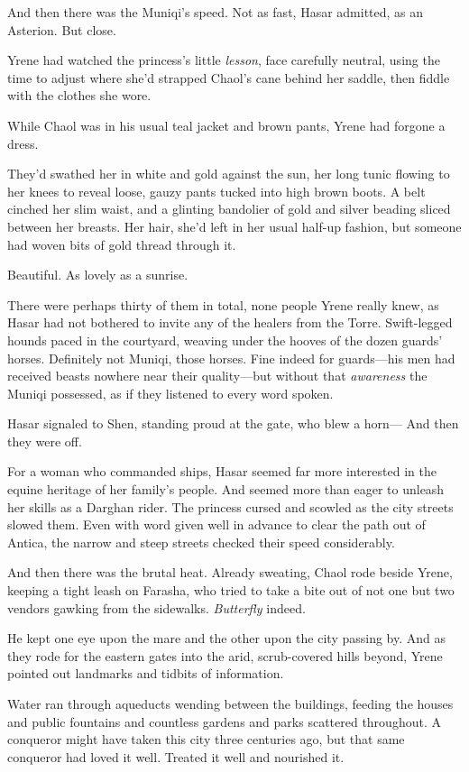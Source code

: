 And then there was the Muniqi's speed.
Not as fast, Hasar admitted, as an Asterion.
But close.

Yrene had watched the princess's little \emph{lesson}, face carefully neutral, using the time to adjust where she'd strapped Chaol's cane behind her saddle, then fiddle with the clothes she wore.

While Chaol was in his usual teal jacket and brown pants, Yrene had forgone a dress.

They'd swathed her in white and gold against the sun, her long tunic flowing to her knees to reveal loose, gauzy pants tucked into high brown boots.
A belt cinched her slim waist, and a glinting bandolier of gold and silver beading sliced between her breasts.
Her hair, she'd left in her usual half-up fashion, but someone had woven bits of gold thread through it.

Beautiful.
As lovely as a sunrise.

There were perhaps thirty of them in total, none people Yrene really knew, as Hasar had not bothered to invite any of the healers from the Torre.
Swift-legged hounds paced in the courtyard, weaving under the hooves of the dozen guards' horses.
Definitely not Muniqi, those horses.
Fine indeed for guards---his men had received beasts nowhere near their quality---but without that \emph{awareness} the Muniqi possessed, as if they listened to every word spoken.

Hasar signaled to Shen, standing proud at the gate, who blew a horn--- And then they were off.

For a woman who commanded ships, Hasar seemed far more interested in the equine heritage of her family's people.
And seemed more than eager to unleash her skills as a Darghan rider.
The princess cursed and scowled as the city streets slowed them.
Even with word given well in advance to clear the path out of Antica, the narrow and steep streets checked their speed considerably.

And then there was the brutal heat.
Already sweating, Chaol rode beside Yrene, keeping a tight leash on Farasha, who tried to take a bite out of not one but two vendors gawking from the sidewalks.
\emph{Butterfly}
indeed.

He kept one eye upon the mare and the other upon the city passing by.
And as they rode for the eastern gates into the arid, scrub-covered hills beyond, Yrene pointed out landmarks and tidbits of information.

Water ran through aqueducts wending between the buildings, feeding the houses and public fountains and countless gardens and parks scattered throughout.
A conqueror might have taken this city three centuries ago, but that same conqueror had loved it well.
Treated it well and nourished it.

